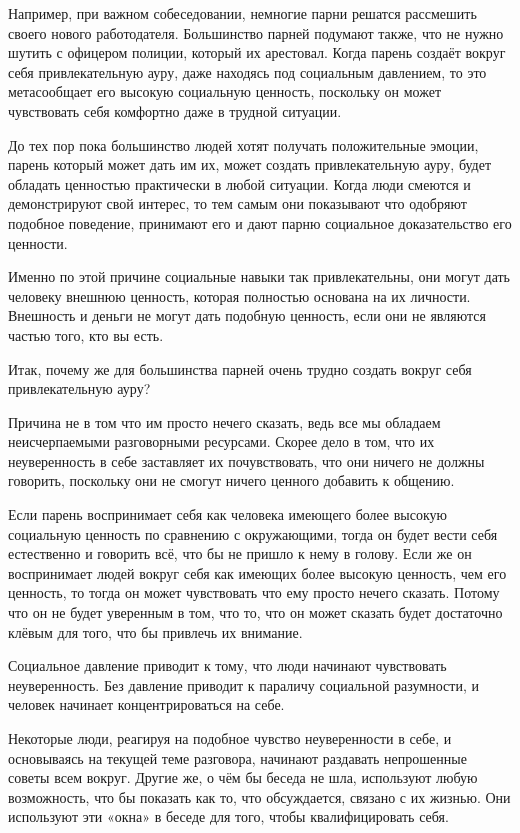 Например, при важном собеседовании, немногие парни решатся рассмешить своего нового работодателя. Большинство парней подумают также, что не нужно шутить с офицером полиции, который их арестовал. Когда парень создаёт вокруг себя привлекательную ауру, даже находясь под социальным давлением, то это метасообщает его высокую социальную ценность, поскольку он может чувствовать себя комфортно даже в трудной ситуации.

До тех пор пока большинство людей хотят получать положительные эмоции, парень который может дать им их, может создать привлекательную ауру, будет обладать ценностью практически в любой ситуации. Когда люди смеются и демонстрируют свой интерес, то тем самым они показывают что одобряют подобное поведение, принимают его и дают парню социальное доказательство его ценности.

Именно по этой причине социальные навыки так привлекательны, они могут дать человеку внешнюю ценность, которая полностью основана на их личности. Внешность и деньги не могут дать подобную ценность, если они не являются частью того, кто вы есть.

Итак, почему же для большинства парней очень трудно создать вокруг себя привлекательную ауру?

Причина не в том что им просто нечего сказать, ведь все мы обладаем неисчерпаемыми разговорными ресурсами. Скорее дело в том, что их неуверенность в себе заставляет их почувствовать, что они ничего не должны говорить, поскольку они не смогут ничего ценного добавить к общению.

Если парень воспринимает себя как человека имеющего более высокую социальную ценность по сравнению с окружающими, тогда он будет вести себя естественно и говорить всё, что бы не пришло к нему в голову. Если же он воспринимает людей вокруг себя как имеющих более высокую ценность, чем его ценность, то тогда он может чувствовать что ему просто нечего сказать. Потому что он не будет уверенным в том, что то, что он может сказать будет достаточно клёвым для того, что бы привлечь их внимание.

Социальное давление приводит к тому, что люди начинают чувствовать неуверенность. Без давление приводит к параличу социальной разумности, и человек начинает концентрироваться на себе.

Некоторые люди, реагируя на подобное чувство неуверенности в себе, и основываясь на текущей теме разговора, начинают раздавать непрошенные советы всем вокруг. Другие же, о чём бы беседа не шла, используют любую возможность, что бы показать как то, что обсуждается, связано с их жизнью. Они используют эти «окна» в беседе для того, чтобы квалифицировать себя.

